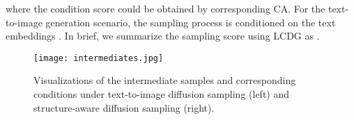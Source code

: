 \documentclass{article}
\begin{document}
where the condition score could be obtained by corresponding CA. For the text-to-image generation scenario, the sampling process is conditioned on the text embeddings . In brief, we summarize the sampling score using LCDG as . 



\begin{figure}[t!]
  \centering
  \texttt{[image: intermediates.jpg]} \vspace{-1em}
  \caption{Visualizations of the intermediate samples and corresponding conditions under text-to-image diffusion sampling (left) and structure-aware diffusion sampling (right).}
\label{figure:visualizations of Intermediates}
\vspace{-1em}
\end{figure}
\end{document}
